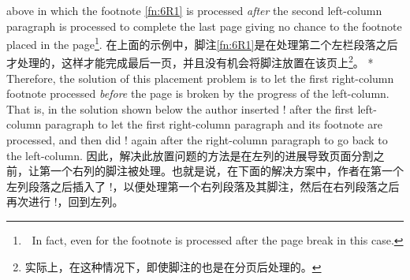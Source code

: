 \begin{paracol}{2}
above in which the footnote \ref{fn:6R1} is processed {\em after} the
second left-column paragraph is processed to complete the last page giving
no chance to the footnote placed in the page\footnote{%

In fact, even  for the footnote is processed after the page
break in this case.}.
\switchcolumn
在上面的示例中，脚注\ref{fn:6R1}是在处理第二个左栏段落之后才处理的，这样才能完成最后一页，并且没有机会将脚注放置在该页上\footnote{实际上，在这种情况下，即使脚注的也是在分页后处理的。}。
\switchcolumn[0]*
Therefore, the solution of this placement problem is to let the first
right-column footnote processed {\em before} the page is broken by the
progress of the left-column.  That is, in the solution shown below the
author inserted \!\switchcolumn! after the first left-column paragraph to
let the first right-column paragraph and its footnote are processed, and
then did \!\switchcolumn! again after the right-column paragraph to go
back to the left-column.
\switchcolumn
因此，解决此放置问题的方法是在左列的进展导致页面分割之前，让第一个右列的脚注被处理。也就是说，在下面的解决方案中，作者在第一个左列段落之后插入了 \!\switchcolumn!，以便处理第一个右列段落及其脚注，然后在右列段落之后再次进行 \!\switchcolumn!，回到左列。

\end{paracol}

